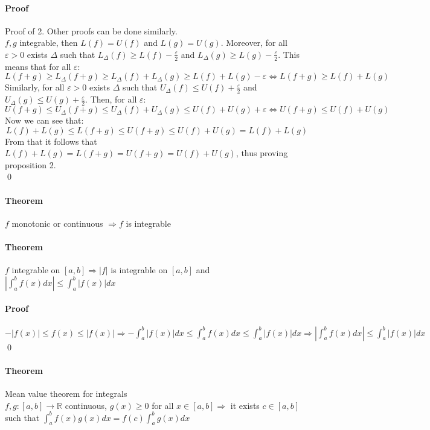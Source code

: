 \documentclass{article}
\newcommand{\abs}[1]{\left|#1\right|}
\newcommand{\functoR}[2]{#1 : #2 \rightarrow \mathbb{R}}
\newcommand{\intcc}[1]{\left[#1\right]}
\newcommand{\Ep}{\varepsilon}
\newcommand{\Theorem}{\paragraph{Theorem}}
\newcommand{\Proof}{\paragraph{Proof}}
\begin{document}
  \Proof Proof of 2. Other proofs can be done similarly.
\\$f,g$ integrable, then $L(f) = U(f)$ and $L(g) = U(g)$. Moreover, for all
  $\Ep > 0$ exists $\Delta$ such that $L_\Delta(f) \geq L(f) - \frac{\Ep}2$ and
  $L_\Delta(g) \geq L(g) - \frac{\Ep}2$. This means that for all $\Ep$:
  \begin{equation*}
    L(f+g) \geq L_\Delta(f+g) \geq L_\Delta(f) + L_\Delta(g) \geq L(f) + L(g) -
    \Ep \iff L(f+g) \geq L(f) + L(g)
  \end{equation*}
  Similarly, for all $\Ep > 0$ exists $\Delta$ such that $U_\Delta(f) \leq U(f)
  + \frac{\Ep}2$ and $U_\Delta(g) \leq U(g) + \frac{\Ep}2$. Then, for all $\Ep$:
  \begin{equation*}
    U(f+g) \leq U_\Delta(f+g) \leq U_\Delta(f) + U_\Delta(g) \leq U(f) + U(g) +
    \Ep \iff U(f+g) \leq U(f) + U(g)
  \end{equation*}
  Now we can see that:
  \begin{equation*}
    L(f) + L(g) \leq L(f+g) \leq U(f+g) \leq U(f) + U(g) = L(f) + L(g)
  \end{equation*}
  From that it follows that $L(f) + L(g) = L(f+g) = U(f+g) = U(f) + U(g)$, thus
  proving proposition 2.
\\\qed

  \Theorem $f$ monotonic or continuous $\Rightarrow f$ is integrable

  \Theorem $f$ integrable on $\intcc{a,b} \Rightarrow |f|$ is integrable on
  $\intcc{a,b}$ and $\abs{\int_a^b f(x) dx} \leq \int_a^b |f(x)| dx$

  \Proof $-|f(x)| \leq f(x) \leq |f(x)| \Rightarrow -\int_a^b |f(x)| dx \leq
  \int_a^b f(x) dx \leq \int_a^b |f(x)| dx \Rightarrow \abs{\int_a^b f(x) dx}
  \leq \int_a^b |f(x)| dx$
\\\qed

  \Theorem Mean value theorem for integrals
\\$\functoR{f,g}{\intcc{a,b}}$ continuous, $g(x) \geq 0$ for all $x \in
  \intcc{a,b} \Rightarrow$ it exists $c \in \intcc{a,b}$ such that $\int_a^b
  f(x)g(x) dx = f(c) \int_a^b g(x) dx$
\end{document}
